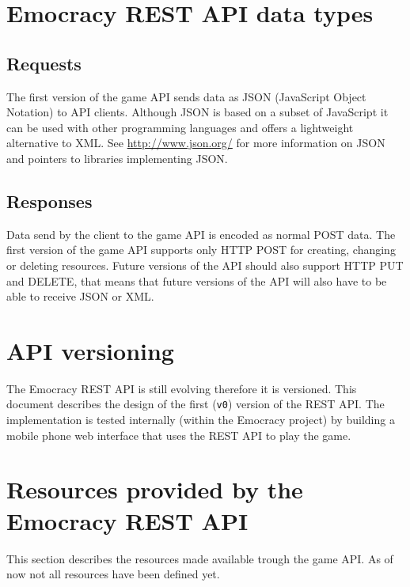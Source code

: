 \documentclass[a4paper]{report}
\begin{document}
\section{Emocracy REST API data types}
\subsection{Requests}
The first version of the game API sends data as JSON (JavaScript Object Notation)
to API clients. Although JSON is based on a subset of JavaScript it can be used
with other programming languages and offers a lightweight alternative to XML.
See \url{http://www.json.org/} for more information on JSON and pointers to 
libraries implementing JSON. 
\subsection{Responses}
Data send by the client to the game API is encoded as normal POST data. The 
first version of the game API supports only HTTP POST for creating, changing
or deleting resources. Future versions of the API should also support HTTP PUT 
and DELETE, that means that future versions of the API will also have to be able
to receive JSON or XML.

\section{API versioning}
The Emocracy REST API is still evolving therefore it is versioned. This document
describes the design of the first (\texttt{v0}) version of the REST API. The 
implementation is tested internally (within the Emocracy project) by building a
mobile phone web interface that uses the REST API to play the game.

\section{Resources provided by the Emocracy REST API}\label{resources}
This section describes the resources made available trough the game API. As 
of now not all resources have been defined yet.
\end{document}
